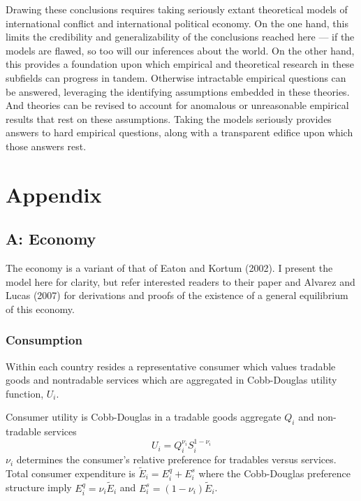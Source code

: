 \documentclass{puthesis}
\begin{document}
Drawing these conclusions requires taking seriously extant theoretical
models of international conflict and international political economy. On
the one hand, this limits the credibility and generalizability of the
conclusions reached here --- if the models are flawed, so too will our
inferences about the world. On the other hand, this provides a
foundation upon which empirical and theoretical research in these
subfields can progress in tandem. Otherwise intractable empirical
questions can be answered, leveraging the identifying assumptions
embedded in these theories. And theories can be revised to account for
anomalous or unreasonable empirical results that rest on these
assumptions. Taking the models seriously provides answers to hard
empirical questions, along with a transparent edifice upon which those
answers rest.

\clearpage

\section{Appendix}

\subsection{A: Economy}

The economy is a variant of that of Eaton and Kortum (2002). I present
the model here for clarity, but refer interested readers to their paper
and Alvarez and Lucas (2007) for derivations and proofs of the existence
of a general equilibrium of this economy.

\subsubsection{Consumption}

Within each country resides a representative consumer which values
tradable goods and nontradable services which are aggregated in
Cobb-Douglas utility function, \(U_i\).

Consumer utility is Cobb-Douglas in a tradable goods aggregate \(Q_i\)
and non-tradable services \begin{equation} \label{eq:CD}
U_i = Q_i^{\nu_i} S_i^{1 - \nu_i}
\end{equation} \(\nu_i\) determines the consumer's relative preference
for tradables versus services. Total consumer expenditure is
\(\tilde{E}_i = E_i^q + E_i^s\) where the Cobb-Douglas preference
structure imply \(E_i^q = \nu_i \tilde{E}_i\) and
\(E_i^s = (1 - \nu_i) \tilde{E}_i\).
\end{document}
